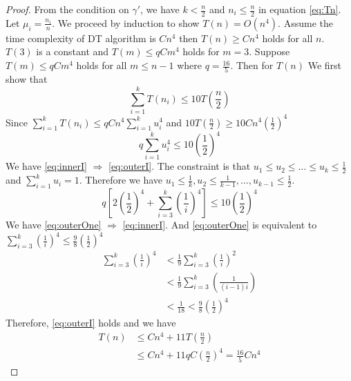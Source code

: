 \documentclass[runningheads]{llncs}
\begin{document}
\begin{proof}
	From the condition on $\gamma'$, we have $k < \frac{n}{2} $ and $n_i \leq \frac{n}{2}$ in equation \eqref{eq:Tn}. Let $\mu_i = \frac{n_i}{n}$. We proceed by induction to show $T(n) = O(n^4)$. Assume the time complexity of DT algorithm is $C n^4$ then $T(n) \geq Cn^4$ holds for all $n$. $T(3)$ is a constant and $T(m) \leq q C m^4$ holds for $m=3$. Suppose
	$T(m) \leq qC m^4$ holds for all $m \leq n-1$ where $q=\frac{16}{5}$. Then for $T(n)$
	We first show that 
	\begin{equation}\label{eq:outerI}
	\sum_{i=1}^k T(n_i) \leq 10 T(\frac{n}{2})
	\end{equation}
	Since $\sum_{i=1}^k T(n_i) \leq qC n^4\sum_{i=1}^k u_i^4$ and $10 T(\frac{n}{2}) \geq 10Cn^4 (\frac{1}{2})^4$
	\begin{equation}\label{eq:innerI}
       q\sum_{i=1}^k u_i^4 \leq 10 (\frac{1}{2})^4 
	\end{equation}
	We have \eqref{eq:innerI} $\Rightarrow$ \eqref{eq:outerI}. The constraint is that $u_1\leq u_2 \leq \dots \leq u_k \leq \frac{1}{2}$ and $\sum_{i=1}^k u_i = 1$. Therefore we have $u_1 \leq \frac{1}{k}, u_2 \leq \frac{1}{k-1}, \dots, u_{k-1} \leq \frac{1}{2}$.
	\begin{equation}\label{eq:outerOne}
	 q[2(\frac{1}{2})^4 + \sum_{i=3}^k (\frac{1}{i})^4] \leq 10 (\frac{1}{2})^4
	\end{equation}
	We have \eqref{eq:outerOne} $\Rightarrow$ \eqref{eq:innerI}. And \eqref{eq:outerOne} is equivalent to
	$\sum_{i=3}^k (\frac{1}{i})^4 \leq \frac{9}{8}(\frac{1}{2})^4$
	\begin{align*}
		\sum_{i=3}^k (\frac{1}{i})^4 & < \frac{1}{9}\sum_{i=3}^k (\frac{1}{i})^2 \\
		& < \frac{1}{9}\sum_{i=3}^k (\frac{1}{(i-1)i}) \\
		& < \frac{1}{18} < \frac{9}{8}(\frac{1}{2})^4
	\end{align*}
	Therefore, \eqref{eq:outerI} holds and we have 
	\begin{align}
		T(n)  & \leq Cn^4 + 11T(\frac{n}{2}) \\
		& \leq C n^4 + 11 q C (\frac{n}{2})^4 = \frac{16}{5} C n^4
	\end{align}
\end{proof}	
\end{document}
